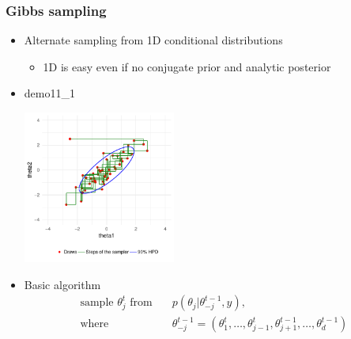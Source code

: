 \documentclass[10pt,handout]{beamer}
\begin{document}

\begin{frame}

\frametitle{ Gibbs sampling}

  \begin{itemize}
  \item Alternate sampling from 1D conditional distributions
    \begin{itemize}
    \item 1D is easy even if no conjugate prior and analytic posterior
    \end{itemize}
  \item<2-> demo11\_1\\
    \vspace{-.5\baselineskip}
     \begin{center}
       \includegraphics[width=5cm]{figs/Gibbs1.pdf}
     \end{center}
    \vspace{-.5\baselineskip}
     \item<3-> Basic algorithm {
      \begin{align*}
         \text{sample $\theta_j^t$ from} \quad & p(\theta_j|\theta_{-j}^{t-1}, y),\\
      \text{where} \quad
        & \theta^{t-1}_{-j}= (\theta^t_1,\dots,\theta^t_{j-1},
        \theta^{t-1}_{j+1},\dots,\theta^{t-1}_d)
      \end{align*}
      }
  \end{itemize}

\end{frame}
\end{document}
